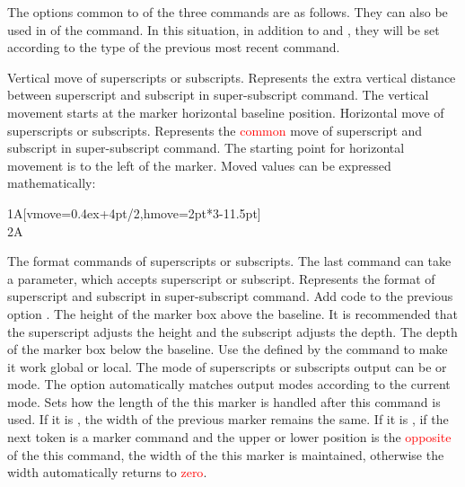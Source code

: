 \documentclass[load-preamble+]{cnltx-doc}
\renewcommand{\emph}[1]{\textcolor{red}{#1}}
\begin{document}
The options common to  of the three commands are as follows. They can also be used in  of the  command. In this situation, in addition to  and , they will be set according to the type of the previous most recent command.
\begin{options}
  \Default{0pt}
  Vertical move of superscripts or subscripts. Represents the extra vertical distance  between superscript and subscript in super-subscript command. The vertical movement starts at the marker horizontal baseline position.
  \Default{0pt}
  Horizontal move of superscripts or subscripts. Represents the \emph{common} move of superscript and subscript in super-subscript command. The starting point for horizontal movement is to the left of the marker. Moved values can be expressed mathematically:
\begin{demohigh}
1A[vmove=0.4ex+4pt/2,hmove=2pt*3-11.5pt] \\
2A
\end{demohigh}
  The format commands of superscripts or subscripts. The last command can take a parameter, which accepts superscript or subscript. Represents the format  of superscript and subscript in super-subscript command.
  Add code to the previous option .
  The height of the marker box above the baseline. It is recommended that the superscript adjusts the height and the subscript adjusts the depth.
  The depth of the marker box below the baseline.
  Use the  defined by the  command to make it work global or local.
  The mode of superscripts or subscripts output can be  or  mode. The  option automatically matches output modes according to the current mode.
  Sets how the length of the this marker is handled after this command is used. If it is , the width of the previous marker remains the same. If it is , if the next token is a marker command and the upper or lower position is the \textcolor{red}{opposite} of the this command, the width of the this marker is maintained, otherwise the width automatically returns to \textcolor{red}{zero}.
\begin{demohigh}

\end{demohigh}
\end{options}
\end{document}
